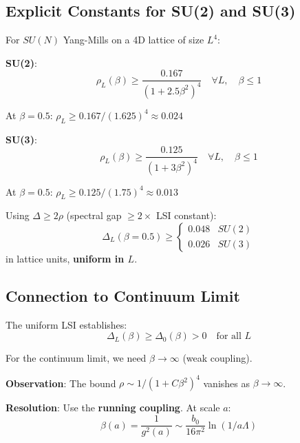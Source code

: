 \subsection{Explicit Constants for SU(2) and SU(3)}

\begin{theorem}
\label{thm:explicit-lsi-bounds}
For $SU(N)$ Yang-Mills on a 4D lattice of size $L^4$:

\textbf{SU(2)}:
\[
\rho_L(\beta) \geq \frac{0.167}{(1 + 2.5\beta^2)^4} \quad \forall L, \quad \beta \leq 1
\]

At $\beta = 0.5$: $\rho_L \geq 0.167/(1.625)^4 \approx 0.024$

\textbf{SU(3)}:
\[
\rho_L(\beta) \geq \frac{0.125}{(1 + 3\beta^2)^4} \quad \forall L, \quad \beta \leq 1
\]

At $\beta = 0.5$: $\rho_L \geq 0.125/(1.75)^4 \approx 0.013$
\end{theorem}

\begin{corollary}
Using $\Delta \geq 2\rho$ (spectral gap $\geq 2 \times$ LSI constant):
\[
\Delta_L(\beta = 0.5) \geq \begin{cases}
0.048 & SU(2) \\
0.026 & SU(3)
\end{cases}
\]
in lattice units, \textbf{uniform in $L$}.
\end{corollary}

\subsection{Connection to Continuum Limit}

The uniform LSI establishes:
\[
\Delta_L(\beta) \geq \Delta_0(\beta) > 0 \quad \text{for all } L
\]

For the continuum limit, we need $\beta \to \infty$ (weak coupling).

\textbf{Observation}: The bound $\rho \sim 1/(1 + C\beta^2)^4$ vanishes as $\beta \to \infty$.

\textbf{Resolution}: Use the \textbf{running coupling}. At scale $a$:
\[
\beta(a) = \frac{1}{g^2(a)} \sim \frac{b_0}{16\pi^2} \ln(1/a\Lambda)
\]

